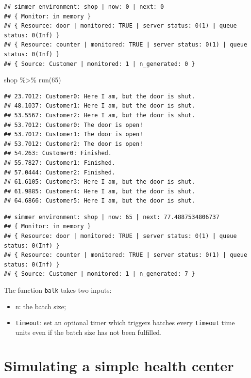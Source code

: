 \documentclass[
]{book}
\newenvironment{Shaded}{\begin{snugshade}}{\end{snugshade}}
\newcommand{\DecValTok}[1]{\textcolor[rgb]{0.00,0.00,0.81}{#1}}
\newcommand{\FunctionTok}[1]{\textcolor[rgb]{0.00,0.00,0.00}{#1}}
\newcommand{\NormalTok}[1]{#1}
\newcommand{\SpecialCharTok}[1]{\textcolor[rgb]{0.00,0.00,0.00}{#1}}
\begin{document}
\begin{verbatim}
## simmer environment: shop | now: 0 | next: 0
## { Monitor: in memory }
## { Resource: door | monitored: TRUE | server status: 0(1) | queue status: 0(Inf) }
## { Resource: counter | monitored: TRUE | server status: 0(1) | queue status: 0(Inf) }
## { Source: Customer | monitored: 1 | n_generated: 0 }
\end{verbatim}

\begin{Shaded}
\begin{Highlighting}[]
\NormalTok{shop }\SpecialCharTok{\%\textgreater{}\%} \FunctionTok{run}\NormalTok{(}\DecValTok{65}\NormalTok{)}
\end{Highlighting}
\end{Shaded}

\begin{verbatim}
## 23.7012: Customer0: Here I am, but the door is shut.
## 48.1037: Customer1: Here I am, but the door is shut.
## 53.5567: Customer2: Here I am, but the door is shut.
## 53.7012: Customer0: The door is open!
## 53.7012: Customer1: The door is open!
## 53.7012: Customer2: The door is open!
## 54.263: Customer0: Finished.
## 55.7827: Customer1: Finished.
## 57.0444: Customer2: Finished.
## 61.6105: Customer3: Here I am, but the door is shut.
## 61.9885: Customer4: Here I am, but the door is shut.
## 64.6866: Customer5: Here I am, but the door is shut.
\end{verbatim}

\begin{verbatim}
## simmer environment: shop | now: 65 | next: 77.4887534806737
## { Monitor: in memory }
## { Resource: door | monitored: TRUE | server status: 0(1) | queue status: 0(Inf) }
## { Resource: counter | monitored: TRUE | server status: 0(1) | queue status: 0(Inf) }
## { Source: Customer | monitored: 1 | n_generated: 7 }
\end{verbatim}

The function \texttt{balk} takes two inputs:

\begin{itemize}
\item
  \texttt{n}: the batch size;
\item
  \texttt{timeout}: set an optional timer which triggers batches every \texttt{timeout} time units even if the batch size has not been fulfilled.
\end{itemize}

\hypertarget{simulating-a-simple-health-center}{%
\section{Simulating a simple health center}\label{simulating-a-simple-health-center}}
\end{document}
